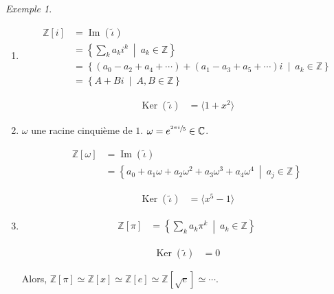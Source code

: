 \documentclass{report}
\theoremstyle{definition}
\theoremstyle{remark}
\newtheorem*{exem}{Exemple}
\def\ZZ{\mathbb{Z}}
\def\RR{\mathbb{R}}
\def\CC{\mathbb{C}}
\def\im{\operatorname{Im}}
\def\noyau{\operatorname{Ker}}
\begin{document}
	\begin{exem}
		\begin{enumerate}
			\item {}

			\begin{align*}
				\ZZ[i]&= \im(\widetilde{\iota})\\
				&= \left\{\sum_ka_ki^k ~\middle|~ a_k\in\ZZ\right\}\\
				&= \left\{ (a_0-a_2+a_4+\cdots) + (a_1-a_3+a_5+\cdots)i ~\middle|~ a_k\in\ZZ \right\}\\
				&= \left\{ A+Bi ~\middle|~ A,B\in\ZZ \right\}
			\end{align*}

			\begin{align*}
				\noyau(\widetilde{\iota})&= \langle 1+x^2 \rangle
			\end{align*}
			\item $\omega$ une racine cinqui\`eme de $1$. $\omega=e^{\sfrac{2\pi i}{5}}\in\CC$.

			\begin{align*}
				\ZZ[\omega]&= \im(\widetilde{\iota})\\
				&= \left\{ a_0+a_1\omega+a_2\omega^2+a_3\omega^3+a_4\omega^4 ~\middle|~ a_j\in\ZZ \right\}
			\end{align*}

			\begin{align*}
				\noyau(\widetilde{\iota})&= \langle x^5-1 \rangle
			\end{align*}
			\item {}
			\begin{align*}
				\ZZ[\pi]&= \left\{ \sum_ka_k\pi^k ~\middle|~ a_k\in\ZZ \right\}
			\end{align*}

			\begin{align*}
				\noyau(\widetilde{\iota})&= 0
			\end{align*}

			Alors, $\ZZ[\pi] \simeq \ZZ[x] \simeq \ZZ[e] \simeq \ZZ[\sqrt{e}] \simeq \cdots$.
		\end{enumerate}
	\end{exem}
\end{document}
